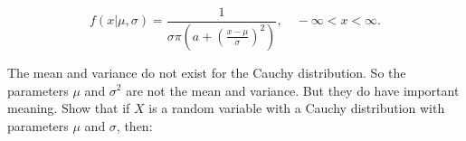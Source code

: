 \documentclass[12pt,letterpaper]{exam}
\begin{document}
\begin{questions}
	\[f(x|\mu,\sigma) = \frac{1}{\sigma\pi \left(a + \left(\frac{x-\mu}{\sigma}\right)^2 \right)} ,\quad -\infty<x<\infty.\]
	
	The mean and variance do not exist for the Cauchy distribution. So the parameters
	\(\mu\) and \(\sigma^2\) are not the mean and variance. But they do have important meaning. Show
	that if \(X\) is a random variable with a Cauchy distribution with parameters \(\mu\) and \(\sigma\),
	then:
	
	
	\begin{solution}
		
	\end{solution}

\end{questions}
\end{document}
